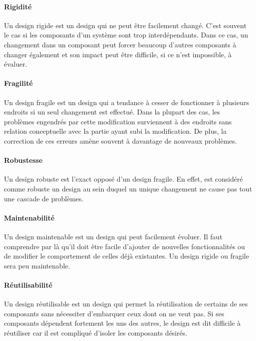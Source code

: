 \documentclass{scrartcl}
\begin{document}
    \paragraph{Rigidité}Un design rigide est un design qui ne peut être facilement changé. C'est souvent le cas si les composants d'un système sont trop interdépendants. Dans ce cas, un changement dans un composant peut forcer beaucoup d'autres composants à changer également et son impact peut être difficile, si ce n'est impossible, à évaluer.

    \paragraph{Fragilité}Un design fragile est un design qui a tendance à cesser de fonctionner à plusieurs endroits si un seul changement est effectué. Dans la plupart des cas, les problèmes engendrés par cette modification surviennent à des endroits sans relation conceptuelle avec la partie ayant subi la modification. De plus, la correction de ces erreurs amène souvent à davantage de nouveaux problèmes.

    \paragraph{Robustesse}Un design robuste est l'exact opposé d'un design fragile. En effet, est considéré comme robuste un design au sein duquel un unique changement ne cause pas tout une cascade de problèmes.

    \paragraph{Maintenabilité}Un design maintenable est un design qui peut facilement évoluer. Il faut comprendre par là qu'il doit être facile d'ajouter de nouvelles fonctionnalités ou de modifier le comportement de celles déjà existantes. Un design rigide ou fragile sera peu maintenable.

    \paragraph{Réutilisabilité}Un design réutilisable est un design qui permet la réutilisation de certains de ses composants sans nécessiter d'embarquer ceux dont on ne veut pas. Si ses composants dépendent fortement les uns des autres, le design est dit difficile à réutiliser car il est compliqué d'isoler les composants désirés.
    
\end{document}
